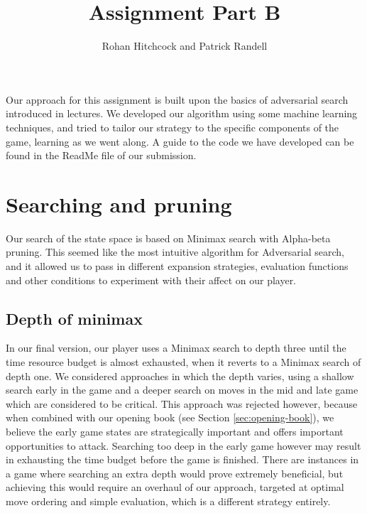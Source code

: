 \documentclass[11pt]{article}
\newcommand{\drafting}[1]{\textcolor{OliveGreen}{#1}}
\begin{document}
\title{\textbf{Assignment Part B}}
\author{Rohan Hitchcock and Patrick Randell}
\date{}
\maketitle

\drafting{
Our approach for this assignment is built upon the basics of adversarial search introduced in lectures. We developed our algorithm using some machine learning techniques, and tried to tailor our strategy to the specific components of the game, learning as we went along.
A guide to the code we have developed can be found in the ReadMe file of our submission.
}

\section{Searching and pruning}
Our search of the state space is based on Minimax search with Alpha-beta pruning. \drafting{This seemed like the most intuitive algorithm for Adversarial search, and it allowed us to pass in different expansion strategies, evaluation functions and other conditions to experiment with their affect on our player.}

\subsection{Depth of minimax}
In our final version, our player uses a Minimax search to depth three until the time resource budget is almost exhausted, when it reverts to a Minimax search of depth one. We considered approaches in which the depth varies, using a shallow search early in the game and a deeper search on moves in the mid and late game which are considered to be critical. This approach was rejected however, because when combined with our opening book (see Section \ref{sec:opening-book}), we believe the early game states are strategically important and offers important opportunities to attack. Searching too deep in the early game however may result in exhausting the time budget before the game is finished. \drafting{There are instances in a game where searching an extra depth would prove extremely beneficial, but achieving this would require an overhaul of our approach, targeted at optimal move ordering and simple evaluation, which is a different strategy entirely.}
\end{document}
